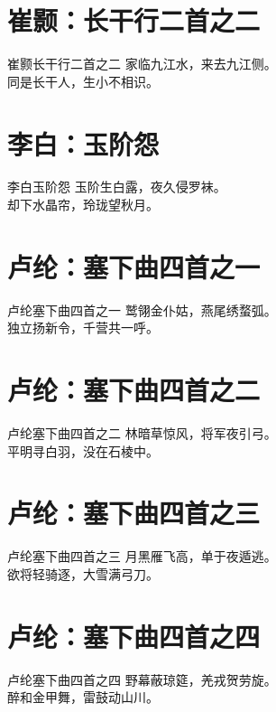 \documentclass[12pt,oneside,a5paper]{book}
\begin{document}
\chapter{崔颢：长干行二首之二}
\begin{poemzh}{崔颢}{长干行二首之二}
家临九江水，来去九江侧。\\
同是长干人，生小不相识。\\ 
\end{poemzh}

\chapter{李白：玉阶怨}
\begin{poemzh}{李白}{玉阶怨}
玉阶生白露，夜久侵罗袜。\\
却下水晶帘，玲珑望秋月。\\ 
\end{poemzh}

\chapter{卢纶：塞下曲四首之一}
\begin{poemzh}{卢纶}{塞下曲四首之一}
鹫翎金仆姑，燕尾绣蝥弧。\\
独立扬新令，千营共一呼。\\ 
\end{poemzh}

\chapter{卢纶：塞下曲四首之二}
\begin{poemzh}{卢纶}{塞下曲四首之二}
林暗草惊风，将军夜引弓。\\
平明寻白羽，没在石棱中。\\ 
\end{poemzh}

\chapter{卢纶：塞下曲四首之三}
\begin{poemzh}{卢纶}{塞下曲四首之三}
月黑雁飞高，单于夜遁逃。\\
欲将轻骑逐，大雪满弓刀。\\ 
\end{poemzh}

\chapter{卢纶：塞下曲四首之四}
\begin{poemzh}{卢纶}{塞下曲四首之四}
野幕蔽琼筵，羌戎贺劳旋。\\
醉和金甲舞，雷鼓动山川。\\ 
\end{poemzh}
\end{document}
